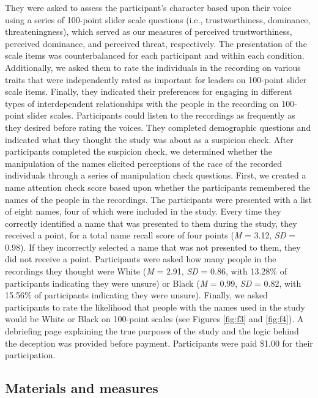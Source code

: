 \documentclass[
  english,
  man, noextraspace,floatsintext]{apa6}
\begin{document}
They were asked to assess the participant's character based upon their voice using a series of 100-point slider scale questions (i.e., trustworthiness, dominance, threateningness), which served as our measures of perceived trustworthiness, perceived dominance, and perceived threat, respectively. The presentation of the scale items was counterbalanced for each participant and within each condition. Additionally, we asked them to rate the individuals in the recording on various traits that were independently rated as important for leaders on 100-point slider scale items. Finally, they indicated their preferences for engaging in different types of interdependent relationships with the people in the recording on 100-point slider scales. Participants could listen to the recordings as frequently as they desired before rating the voices. They completed demographic questions and indicated what they thought the study was about as a suspicion check. After participants completed the suspicion check, we determined whether the manipulation of the names elicited perceptions of the race of the recorded individuals through a series of manipulation check questions. First, we created a name attention check score based upon whether the participants remembered the names of the people in the recordings. The participants were presented with a list of eight names, four of which were included in the study. Every time they correctly identified a name that was presented to them during the study, they received a point, for a total name recall score of four points (\emph{M} = 3.12, \emph{SD} = 0.98). If they incorrectly selected a name that was not presented to them, they did not receive a point. Participants were asked how many people in the recordings they thought were White (\emph{M} = 2.91, \emph{SD} = 0.86, with 13.28\% of participants indicating they were unsure) or Black (\emph{M} = 0.99, \emph{SD} = 0.82, with 15.56\% of participants indicating they were unsure). Finally, we asked participants to rate the likelihood that people with the names used in the study would be White or Black on 100-point scales (see Figures \ref{fig:f3} and \ref{fig:f4}). A debriefing page explaining the true purposes of the study and the logic behind the deception was provided before payment. Participants were paid \$1.00 for their participation.

\hypertarget{materials-and-measures}{%
\subsection{Materials and measures}\label{materials-and-measures}}
\end{document}
